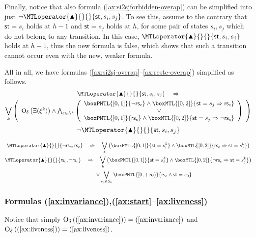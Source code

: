 \documentclass[a4paper]{article}
\newcommand{\frf}[1]{(\ref{#1})}
\newcommand{\fsrf}[2]{(\ref{#1}--\ref{#2})}
\newcommand{\overap}[1]{\mathrm{O}_{\delta}\left({#1}\right)}
\newcommand{\st}{\mathsf{st}}
\newcommand{\rest}[1]{\mathsf{rs}_{#1}}
\newcommand{\becomesOMTL}[1]{\MTLoperator{\blacktriangle}{}{}{#1}}
\theoremstyle{plain}
\theoremstyle{definition}
\begin{document}
Finally, notice that also formula \frf{ax:si2sjforbidden-overap} can be simplified into just $\neg \becomesOMTL{\st, s_i, s_j}$.
To see this, assume to the contrary that $\st = s_i$ holds at $h-1$ and $\st = s_j$ holds at $h$, for some pair of states $s_i,s_j$ which do not belong to any transition.
In this case, $\becomesOMTL{\st, s_i, s_j}$ holds at $h - 1$, thus the new formula is false, which shows that such a transition cannot occur even with the new, weaker formula.

All in all, we have formulas \fsrf{ax:si2sj-overap}{ax:restc-overap} simplified as follows.
\begin{multline} \label{ax:si2sj-overap-simp}
   \becomesOMTL{\st, s_i, s_j} \quad \Rightarrow \\
       \bigvee_k \left( \begin{array}{c}
           \overap{\Xi(\xi^k)} \wedge 
         \bigwedge_{c \in \Lambda^k} \left( \begin{array}{c}
             \boxPMTL{[0,1]}{\neg \rest{c}} \wedge \boxMTL{[0,2]}{\st = s_j \Rightarrow \rest{c}} \\
             \vee \\
             \boxPMTL{[0,1]}{\rest{c}} \wedge \boxMTL{[0,2]}{\st = s_j \Rightarrow \neg \rest{c}}
             \end{array} \right)
             \end{array} \right)
\end{multline}
\begin{equation} \label{ax:si2sjforbidden-overap-simp}
  \neg \becomesOMTL{\st, s_i, s_j}
\end{equation}

\begin{gather}
  \becomesOMTL{\neg \rest{c}, \rest{c}} \quad \Rightarrow \quad 
    \bigvee_k \left( \boxPMTL{[0,1]}{\st = s_i^k} \wedge \boxMTL{[0,2]}{\rest{c} \Rightarrow \st = s_j^k} \right)
    \nonumber \\
  \becomesOMTL{\rest{c}, \neg \rest{c}} \quad \Rightarrow \quad 
    \bigvee_k \left( \boxPMTL{[0,1]}{\st = s_i^k} \wedge \boxMTL{[0,2]}{\neg \rest{c} \Rightarrow \st = s_j^k} \right)
	 \nonumber \\
    \qquad \qquad \qquad \vee \bigvee_{s_0 \in S_0} \boxPMTL{[0, +\infty)}{\rest{c} \wedge \st = s_0}
       \label{ax:restc-overap-simp}
\end{gather}




\subsubsection{Formulas \frf{ax:invariance},\fsrf{ax:start}{ax:liveness}}
Notice that simply $\overap{\frf{ax:invariance}} = \frf{ax:invariance}$ and $\overap{\frf{ax:liveness}} = \frf{ax:liveness}$.
\end{document}
